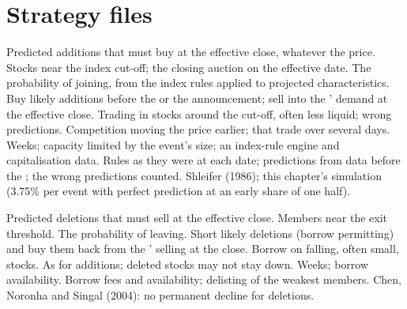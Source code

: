 \section{Strategy files}

\begin{strategyfile}{Predicted additions}\label{strat:s1:index-rebalancing:additions}
  that must buy at the effective close, whatever the price.
 Stocks near the index cut-off; the closing auction on the effective date.
 The probability of joining, from the index rules applied to projected characteristics.
 Buy likely additions before the  or the announcement; sell into the ' demand at the effective close.
 Trading in stocks around the cut-off, often less liquid; wrong predictions.
 Competition moving the price earlier;  that trade over several days.
 Weeks; capacity limited by the event's size; an index-rule engine and capitalisation data.
 Rules as they were at each date; predictions from data before the ; the wrong predictions counted.
 Shleifer (1986); this chapter's simulation (3.75\% per event with perfect prediction at an early share of one half).
\end{strategyfile}

\begin{strategyfile}{Predicted deletions}\label{strat:s1:index-rebalancing:deletions}
  that must sell at the effective close.
 Members near the exit threshold.
 The probability of leaving.
 Short likely deletions (borrow permitting) and buy them back from the ' selling at the close.
 Borrow on falling, often small, stocks.
 As for additions; deleted stocks may not stay down.
 Weeks; borrow availability.
 Borrow fees and availability; delisting of the weakest members.
 Chen, Noronha and Singal (2004): no permanent decline for deletions.
\end{strategyfile}

